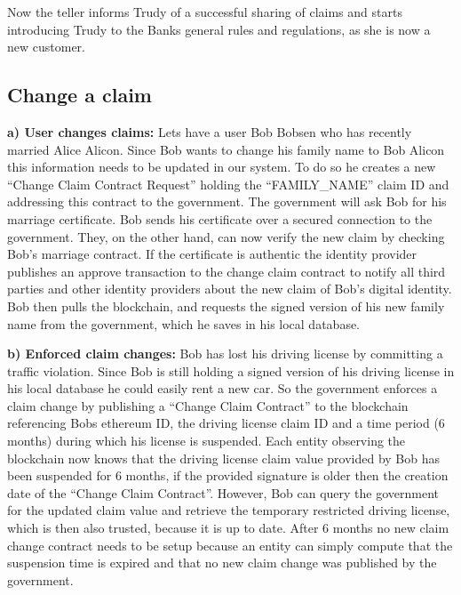 Now the teller informs Trudy of a successful sharing of claims and starts introducing Trudy to the Banks general rules and regulations, as she is now a new customer.

\subsection{Change a claim}
\label{sec:changeClaimUseCase}
\textbf{a) User changes claims:}
Lets have a user Bob Bobsen who has recently married Alice Alicon. Since Bob wants to change his family name to Bob Alicon this information needs to be updated in our system. To do so he creates a new “Change Claim Contract Request” holding the “FAMILY\_NAME” claim ID and addressing this contract to the government. The government will ask Bob for his marriage certificate. Bob sends his certificate over a secured connection to the government. They, on the other hand, can now verify the new claim by checking Bob's marriage contract. If the certificate is authentic the identity provider publishes an approve transaction to the change claim contract to notify all third parties and other identity providers about the new claim of Bob's digital identity.
Bob then pulls the blockchain, and requests the signed version of his new family name from the government, which he saves in his local database.

\textbf{b) Enforced claim changes:}
Bob has lost his driving license by committing a traffic violation. Since Bob is still holding a signed version of his driving license in his local database he could easily rent a new car. So the government enforces a claim change by publishing a “Change Claim Contract” to the blockchain referencing Bobs ethereum ID, the driving license claim ID and a time period (6 months) during which his license is suspended. Each entity observing the blockchain now knows that the driving license claim value provided by Bob has been suspended for 6 months, if the provided signature is older then the creation date of the “Change Claim Contract”. However, Bob can query the government for the updated claim value and retrieve the temporary restricted driving license, which is then also trusted, because it is up to date. After 6 months no new claim change contract needs to be setup because an entity can simply compute that the suspension time is expired and that no new claim change was published by the government.
